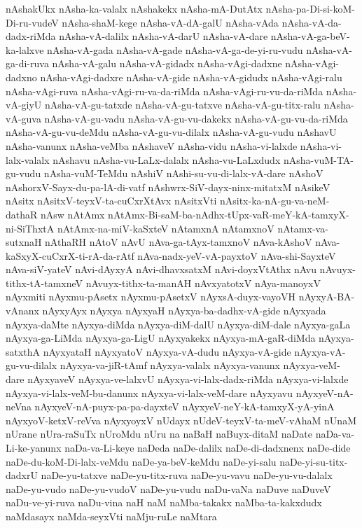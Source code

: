 {nAshakUkx
nAsha-ka-valalx
nAshakekx
nAsha-mA-DutAtx
nAsha-pa-Di-si-koM-Di-ru-vudeV
nAsha-shaM-kege
nAsha-vA-dA-galU
nAsha-vAda
nAsha-vA-da-dadx-riMda
nAsha-vA-dalilx
nAsha-vA-darU
nAsha-vA-dare
nAsha-vA-ga-beV-ka-lalxve
nAsha-vA-gada
nAsha-vA-gade
nAsha-vA-ga-de-yi-ru-vudu
nAsha-vA-ga-di-ruva
nAsha-vA-galu
nAsha-vA-gidadx
nAsha-vAgi-dadxne
nAsha-vAgi-dadxno
nAsha-vAgi-dadxre
nAsha-vA-gide
nAsha-vA-gidudx
nAsha-vAgi-ralu
nAsha-vAgi-ruva
nAsha-vAgi-ru-va-da-riMda
nAsha-vAgi-ru-vu-da-riMda
nAsha-vA-giyU
nAsha-vA-gu-tatxde
nAsha-vA-gu-tatxve
nAsha-vA-gu-titx-ralu
nAsha-vA-guva
nAsha-vA-gu-vadu
nAsha-vA-gu-vu-dakekx
nAsha-vA-gu-vu-da-riMda
nAsha-vA-gu-vu-deMdu
nAsha-vA-gu-vu-dilalx
nAsha-vA-gu-vudu
nAshavU
nAsha-vanunx
nAsha-veMba
nAshaveV
nAsha-vidu
nAsha-vi-lalxde
nAsha-vi-lalx-valalx
nAshavu
nAsha-vu-LaLx-dalalx
nAsha-vu-LaLxdudx
nAsha-vuM-TA-gu-vudu
nAsha-vuM-TeMdu
nAshiV
nAshi-su-vu-di-lalx-vA-dare
nAshoV
nAshorxV-Sayx-du-pa-lA-di-vatf
nAshwrx-SiV-dayx-ninx-mitatxM
nAsikeV
nAsitx
nAsitxV-teyxV-ta-cuCxrXtAvx
nAsitxVti
nAsitx-ka-nA-gu-va-neM-dathaR
nAsw
nAtAmx
nAtAmx-Bi-saM-ba-nAdhx-tUpx-vaR-meY-kA-tamxyX-ni-SiThxtA
nAtAmx-na-miV-kaSxteV
nAtamxnA
nAtamxnoV
nAtamx-va-sutxnaH
nAthaRH
nAtoV
nAvU
nAva-ga-tAyx-tamxnoV
nAva-kAshoV
nAva-kaSxyX-cuCxrX-ti-rA-da-rAtf
nAva-nadx-yeV-vA-payxtoV
nAva-shi-SayxteV
nAva-siV-yateV
nAvi-dAyxyA
nAvi-dhavxsatxM
nAvi-doyxVtAthx
nAvu
nAvuyx-tithx-tA-tamxneV
nAvuyx-tithx-ta-manAH
nAvxyatotxV
nAya-manoyxV
nAyxmiti
nAyxmu-pAsetx
nAyxmu-pAsetxV
nAyxsA-duyx-vayoVH
nAyxyA-BA-vAnanx
nAyxyAyx
nAyxya
nAyxyaH
nAyxya-ba-dadhx-vA-gide
nAyxyada
nAyxya-daMte
nAyxya-diMda
nAyxya-diM-dalU
nAyxya-diM-dale
nAyxya-gaLa
nAyxya-ga-LiMda
nAyxya-ga-LigU
nAyxyakekx
nAyxya-mA-gaR-diMda
nAyxya-satxthA
nAyxyataH
nAyxyatoV
nAyxya-vA-dudu
nAyxya-vA-gide
nAyxya-vA-gu-vu-dilalx
nAyxya-va-jiR-tAmf
nAyxya-valalx
nAyxya-vanunx
nAyxya-veM-dare
nAyxyaveV
nAyxya-ve-lalxvU
nAyxya-vi-lalx-dadx-riMda
nAyxya-vi-lalxde
nAyxya-vi-lalx-veM-bu-danunx
nAyxya-vi-lalx-veM-dare
nAyxyavu
nAyxyeV-nA-neVna
nAyxyeV-nA-puyx-pa-pa-dayxteV
nAyxyeV-neY-kA-tamxyX-yA-yinA
nAyxyoV-ketxV-reVva
nAyxyoyxV
nUdayx
nUdeV-teyxV-ta-meV-vAhaM
nUnaM
nUrane
nUra-raSuTx
nUroMdu
nUru
na
naBaH
naBuyx-ditaM
naDate
naDa-va-Li-ke-yanunx
naDa-va-Li-keye
naDeda
naDe-dalilx
naDe-di-dadxnenx
naDe-dide
naDe-du-koM-Di-lalx-veMdu
naDe-ya-beV-keMdu
naDe-yi-salu
naDe-yi-su-titx-dadxrU
naDe-yu-tatxve
naDe-yu-titx-ruva
naDe-yu-vavu
naDe-yu-vu-dalalx
naDe-yu-vudo
naDe-yu-vudoV
naDe-yu-vudu
naDu-vaNa
naDuve
naDuveV
naDu-ve-yi-ruva
naDu-vina
naH
naM
naMba-takakx
naMba-ta-kakxdudx
naMdasayx
naMda-seyxVti
naMju-ruLe
naMtara
}
